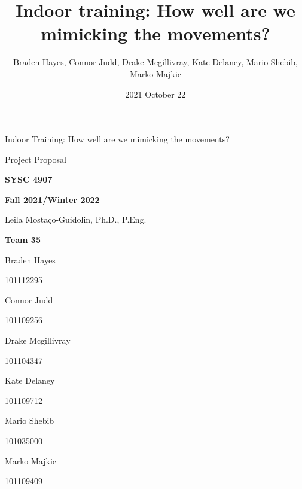\documentclass[11pt,letterpaper]{article}
\title{Indoor training: \newline How well are we mimicking the movements? }
\author{Braden Hayes, Connor Judd, Drake Mcgillivray, Kate Delaney, Mario Shebib, Marko Majkic}
\date{2021 October 22}
\begin{document}
\frenchspacing

\begin{titlepage}
\centering

{\Huge \sffamily Indoor Training: \newline How well are we mimicking the movements?}


{\Huge \sffamily Project Proposal}

{\large \textbf{SYSC 4907}}

{\large \textbf{Fall 2021/Winter 2022}}

Leila Mostaço-Guidolin, Ph.D., P.Eng.


{\large \textbf{Team 35}}

Braden Hayes

{\footnotesize 101112295}

Connor Judd

{\footnotesize 101109256}

Drake Mcgillivray

{\footnotesize 101104347}

Kate Delaney

{\footnotesize 101109712}

Mario Shebib

{\footnotesize 101035000}

Marko Majkic

{\footnotesize 101109409}


\end{titlepage}
\tableofcontents

\end{document}
